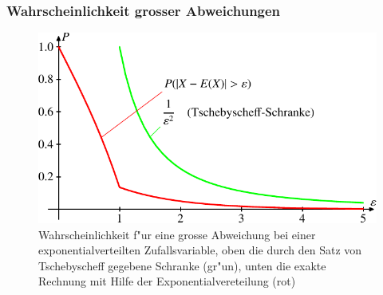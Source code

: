 \subsubsection{Wahrscheinlichkeit grosser Abweichungen}
\begin{figure}
\begin{center}
\includegraphics{images/exp-1.pdf}
\end{center}
\caption{Wahrscheinlichkeit f"ur eine grosse Abweichung bei einer
exponentialverteilten Zufallsvariable, oben die durch den Satz von Tschebyscheff
gegebene Schranke (gr"un), unten die exakte Rechnung mit
Hilfe der Exponentialvereteilung (rot)\label{abweichung-exponential}}
\end{figure}
